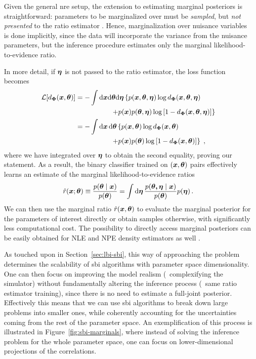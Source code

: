 Given the general \gls*{nre} setup, the extension to estimating marginal posteriors is straightforward: parameters to be marginalized over must be \emph{sampled}, but \emph{not presented} to the ratio estimator  \cite{Miller:2020hua}. Hence, marginalization over nuisance variables is done implicitly, since the data will incorporate the variance from the nuisance parameters, but the inference procedure estimates only the marginal likelihood-to-evidence ratio.

In more detail, if $\bm{\eta}$ is not passed to the ratio estimator, the loss function becomes
\begin{align} 
   \mathcal{L}[d_{\bm{\Phi}}(\bm{x}, \bm{\theta})]&= -\int \dd\bm{x} \dd\bm{\theta} \dd\bm{\eta}\left\{ p(\bm{x},\bm{\theta}, \bm{\eta}) \log d_{\bm{\Phi}}(\bm{x}, \bm{\theta},\bm{\eta}) \right. \notag \\
    &\hspace{1.8cm} \left. + p(\bm{x}) p(\bm{\theta}, \bm{\eta}) \log\left[ 1 - d_{\bm{\Phi}}(\bm{x}, \bm{\theta},\bm{\eta}) \right] \right\} \\
    &= -\int \dd{\ensuremath{\bm{x}}} \dd{\ensuremath{\bm{\theta}}} \left\{ p(\bm{x}, \bm{\theta}) \log d_{\bm{\Phi}}(\bm{x}, \bm{\theta}) \right. \notag \\
    &\hspace{1.8cm} \left. + p(\bm{x}) p(\bm{\theta}) \log\left[ 1 - d_{\bm{\Phi}}(\bm{x}, \bm{\theta}) \right] \right\} \;, \label{eq:sbi-bce-m}
\end{align}
where we have integrated over $\bm{\eta}$ to obtain the second equality, proving our statement. 
As a result, the binary classifier trained on $(\bm{x}, \bm{\theta})$ pairs effectively learns an estimate of the marginal likelihood-to-evidence ratios 
\begin{equation}\label{eq:sbi-ratio_marginal}
    \hat{r}(\bm{x};\bm{\theta}) \equiv \frac{p(\bm{\theta} \mid \bm{x})}{p(\bm{\theta})} =  \int \mathrm{d}\bm{\eta} \, \frac{p(\boldsymbol{\theta, \eta} \mid \bm{x})}{p(\bm{\theta})} p(\bm{\eta})  \, .
\end{equation}
We can then use the marginal ratio $\hat{r}(\bm{x},\bm{\theta})$ to evaluate the marginal posterior for the parameters of interest directly or obtain samples otherwise, with significantly less computational cost. The possibility to directly access marginal posteriors can be easily obtained for  NLE and NPE density estimators as well \cite{Alsing:2019xrx, Jeffrey:2020itg}.

As touched upon in Section~\ref{sec:lbi-sbi}, this way of approaching the problem determines the scalability of \gls*{sbi} algorithms with parameter space dimensionality.
One can then focus on improving the model realism (\ie~complexifying the simulator) without fundamentally altering the inference process (\ie~same ratio estimator training), since there is no need to estimate a full-joint posterior. Effectively this means that we can use \gls*{sbi} algorithms to break down large problems into smaller ones, while coherently accounting for the uncertainties coming from the rest of the parameter space. An exemplification of this process is illustrated in Figure~\ref{fig:sbi-marginals}, where instead of solving the inference problem for the whole parameter space, one can focus on lower-dimensional projections of the correlations. 

